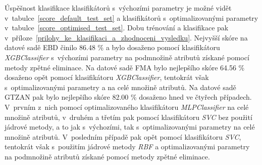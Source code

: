 Úspěšnost klasifikace klasifikátorů s~výchozími parametry je možné vidět v~tabulce~\ref{score_default_test_set} a klasifikátorů s~optimalizovanými parametry v~tabulce~\ref{score_optimised_test_set}. Dobu trénování a klasifikace pak v~příloze~\ref{prilohy_ke_klasifikaci_a_zhodnoceni_vysledku}. Nejvyšší skóre na datové sadě EBD činilo 86.48 \% a bylo dosaženo pomocí klasifikátoru \textit{XGBClassifier} s~výchozími parametry na podmnožině atributů získané pomocí metody zpětné eliminace. Na datové sadě FMA bylo nejlepšího skóre 64.56 \% dosaženo opět pomocí klasifikátoru \textit{XGBClassifier}, tentokrát však s~optimalizovanými parametry a na celé množině atributů. Na datové sadě GTZAN pak bylo nejlepšího skóre 82.00 \% dosaženo hned ve čtyřech případech. V~prvním z~nich pomocí optimalizovaného klasifikátoru \textit{MLPClassifier} na celé množině atributů, v~druhém a třetím pak pomocí klasifikátoru \textit{SVC} bez použití jádrové metody, a to jak s~výchozími, tak s~optimalizovanými parametry na celé množině atributů. V~posledním případě pak opět pomocí klasifikátoru \textit{SVC}, tentokrát však s~použitím jádrové metody \textit{RBF} a optimalizovanými parametry na podmnožině atributů získané pomocí metody zpětné eliminace.


